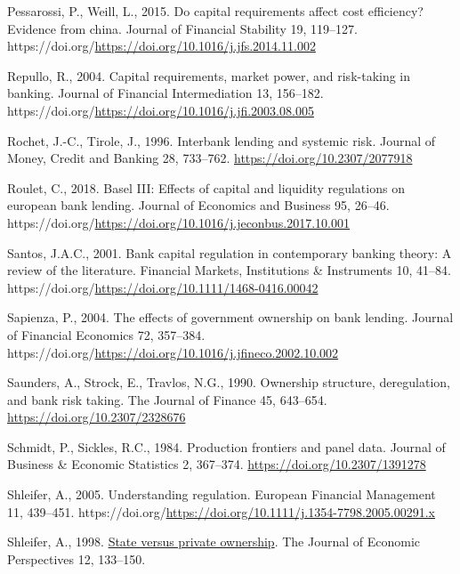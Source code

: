 \documentclass[
  letterpaper,
  DIV=11,
  numbers=noendperiod]{scrreprt}
\newlength{\cslhangindent}
\newenvironment{CSLReferences}[2] %
 {\begin{list}{}{%
  \setlength{\itemindent}{0pt}
  \setlength{\leftmargin}{0pt}
  \setlength{\parsep}{0pt}
  \ifodd #1
   \setlength{\leftmargin}{\cslhangindent}
   \setlength{\itemindent}{-1\cslhangindent}
  \fi
  \setlength{\itemsep}{#2\baselineskip}}}
 {\end{list}}
\begin{document}
\begin{CSLReferences}{1}{0}
Pessarossi, P., Weill, L., 2015. Do capital requirements affect cost
efficiency? Evidence from china. Journal of Financial Stability 19,
119--127.
https://doi.org/\url{https://doi.org/10.1016/j.jfs.2014.11.002}

Repullo, R., 2004. Capital requirements, market power, and risk-taking
in banking. Journal of Financial Intermediation 13, 156--182.
https://doi.org/\url{https://doi.org/10.1016/j.jfi.2003.08.005}

Rochet, J.-C., Tirole, J., 1996. Interbank lending and systemic risk.
Journal of Money, Credit and Banking 28, 733--762.
\url{https://doi.org/10.2307/2077918}

Roulet, C., 2018. Basel III: Effects of capital and liquidity
regulations on european bank lending. Journal of Economics and Business
95, 26--46.
https://doi.org/\url{https://doi.org/10.1016/j.jeconbus.2017.10.001}

Santos, J.A.C., 2001. Bank capital regulation in contemporary banking
theory: A review of the literature. Financial Markets, Institutions \&
Instruments 10, 41--84.
https://doi.org/\url{https://doi.org/10.1111/1468-0416.00042}

Sapienza, P., 2004. The effects of government ownership on bank lending.
Journal of Financial Economics 72, 357--384.
https://doi.org/\url{https://doi.org/10.1016/j.jfineco.2002.10.002}

Saunders, A., Strock, E., Travlos, N.G., 1990. Ownership structure,
deregulation, and bank risk taking. The Journal of Finance 45, 643--654.
\url{https://doi.org/10.2307/2328676}

Schmidt, P., Sickles, R.C., 1984. Production frontiers and panel data.
Journal of Business \& Economic Statistics 2, 367--374.
\url{https://doi.org/10.2307/1391278}

Shleifer, A., 2005. Understanding regulation. European Financial
Management 11, 439--451.
https://doi.org/\url{https://doi.org/10.1111/j.1354-7798.2005.00291.x}

Shleifer, A., 1998. \href{http://www.jstor.org/stable/2646898}{State
versus private ownership}. The Journal of Economic Perspectives 12,
133--150.


\end{CSLReferences}
\end{document}
